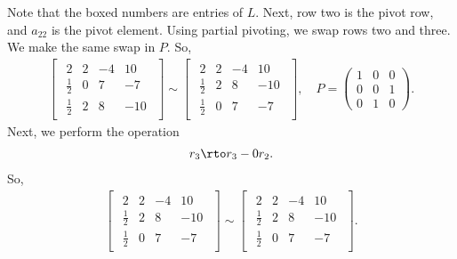 \documentclass{report}
\begin{document}
    Note that the boxed numbers are entries of $L$. Next, row two is the pivot row, and $a_{22}$ is the pivot element. Using partial pivoting, we swap rows two and three. We make the same swap in $P$. So,
    \begin{align*}
        \begin{bmatrix}
            \begin{array}{ccc|c}
                2 & 2 & -4 & 10 \\
                \boxed{\frac{1}{2}} & 0 & 7 & -7 \\
                \boxed{\frac{1}{2}}& 2 & 8 & -10
            \end{array}
        \end{bmatrix}
        \sim
        \begin{bmatrix}
            \begin{array}{ccc|c}
                2 & 2 & -4 & 10 \\
                \boxed{\frac{1}{2}}& 2 & 8 & -10 \\
                \boxed{\frac{1}{2}} & 0 & 7 & -7 
            \end{array}
        \end{bmatrix}
        ,\quad
        P = \begin{pmatrix} 1 & 0 & 0 \\ 0 & 0 & 1 \\ 0 & 1 & 0 \end{pmatrix}
    .\end{align*}
    Next, we perform the operation
    \begin{align*}
        r_{3} \rto r_{3} - 0r_{2}
    .\end{align*}
    So,
    \begin{align*}
        \begin{bmatrix}
            \begin{array}{ccc|c}
                2 & 2 & -4 & 10 \\
                \boxed{\frac{1}{2}}& 2 & 8 & -10 \\
                \boxed{\frac{1}{2}} & 0 & 7 & -7 
            \end{array}
        \end{bmatrix}
        \sim
                \begin{bmatrix}
            \begin{array}{ccc|c}
                2 & 2 & -4 & 10 \\
                \boxed{\frac{1}{2}}& 2 & 8 & -10 \\
                \boxed{\frac{1}{2}} & \boxed{0} & 7 & -7 
            \end{array}
        \end{bmatrix}
    .\end{align*}
\end{document}
